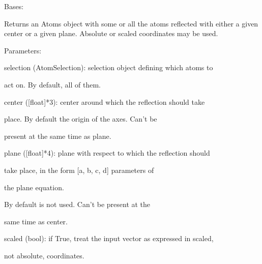 \documentclass[letterpaper,10pt,english]{sphinxmanual}
\begin{document}
\begin{fulllineitems}
\label{doctree/soprano.properties.transform.transform:soprano.properties.transform.transform.Mirror}
Bases: {\hyperref[doctree/soprano.properties.atomsproperty:soprano.properties.atomsproperty.AtomsProperty]{}}

Returns an Atoms object with some or all the atoms reflected with either a
given center or a given plane. Absolute or scaled coordinates may be used.

\begin{DUlineblock}{0em}
\item[] Parameters:
\item[]
\begin{DUlineblock}{\DUlineblockindent}
\item[] selection (AtomSelection): selection object defining which atoms to
\item[]
\begin{DUlineblock}{\DUlineblockindent}
\item[] act on. By default, all of them.
\end{DUlineblock}
\item[] center ({[}float{]}*3): center around which the reflection should take
\item[]
\begin{DUlineblock}{\DUlineblockindent}
\item[] place. By default the origin of the axes. Can't be
\item[] present at the same time as plane.
\end{DUlineblock}
\item[] plane ({[}float{]}*4): plane with respect to which the reflection should
\item[]
\begin{DUlineblock}{\DUlineblockindent}
\item[] take place, in the form {[}a, b, c, d{]} parameters of
\item[] the plane equation.
\item[] By default is not used. Can't be present at the
\item[] same time as center.
\end{DUlineblock}
\item[] scaled (bool): if True, treat the input vector as expressed in scaled,
\item[]
\begin{DUlineblock}{\DUlineblockindent}
\item[] not absolute, coordinates.
\end{DUlineblock}
\end{DUlineblock}
\end{DUlineblock}


\end{fulllineitems}
\end{document}
